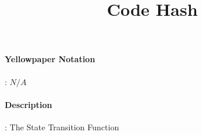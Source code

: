 \documentclass[10pt,a4paper,oneside]{scrartcl}
\title{Code Hash}
\date{}
\begin{document}
\maketitle
\paragraph{Yellowpaper Notation}: $N/A$
\paragraph{Description}: The State Transition Function 
\end{document}
